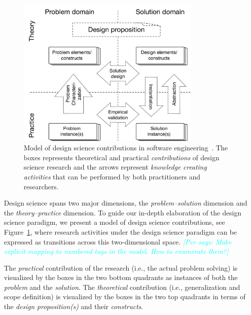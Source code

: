 \documentclass[graybox]{svmult}
\newcommand{\per}[1]{\textcolor{cyan}{{\it [Per says: #1]}}}
\newcommand{\per}[1]{}
\begin{document}
\begin{figure}[t]
\centering
 \includegraphics[width=0.8\textwidth]{Figures/DS_model.pdf}
\caption{Model of design science contributions in software engineering~\cite{Engstrom19arxiv}. The boxes represents theoretical and practical \emph{contributions} of design science research and the arrows represent \emph{knowledge creating activities} that can be performed by both practitioners and researchers.}
\label{fig:DS_model}       %
\end{figure}

Design science spans two major dimensions, the \emph{problem--solution} dimension and the \emph{theory--practice} dimension. To guide our in-depth elaboration of the design science paradigm, we present a model of design science contributions, see Figure~\ref{fig:DS_model}, where research activities under the design science paradigm can be expressed as transitions across this two-dimensional space.
\per{Make explicit mapping to numbered tags in the model. How to enumerate them?}

The \emph{practical} contribution of the research (i.e., the actual problem solving) is visualized by the boxes in the two bottom quadrants as instances of both the \emph{problem} and the \emph{solution}. The \emph{theoretical} contribution (i.e., generalization and scope definition) is visualized by the boxes in the two top quadrants in terms of the \emph{design proposition(s)} and their \emph{constructs}. 
\end{document}

